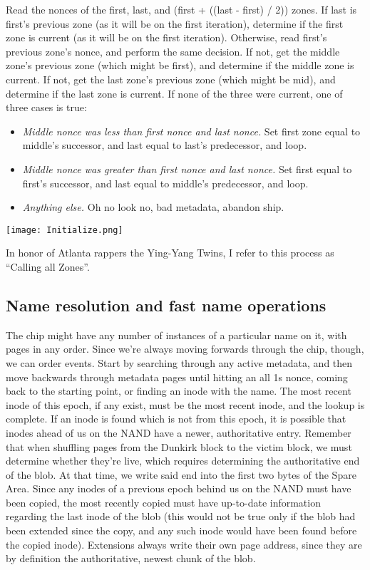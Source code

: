 \documentclass[letterpaper,10pt]{article}
\newenvironment{denseitemize}{
  \begin{itemize}
      \setlength{\itemsep}{0pt}
}{
  \end{itemize}
}
\begin{document}
Read the nonces of the first, last, and (first + ((last - first) / 2)) zones.
If last is first's previous zone (as it will be on the first iteration),
determine if the first zone is current (as it will be on the first iteration).
Otherwise, read first's previous zone's nonce, and perform the same
decision. If not, get the middle zone's previous zone (which might be first),
and determine if the middle zone is current. If not, get the last zone's previous
zone (which might be mid), and determine if the last zone is current. If none
of the three were current, one of three cases is true:
\begin{denseitemize}
\item \textit{Middle nonce was less than first nonce and last nonce.} Set first zone
  equal to middle's successor, and last equal to last's predecessor, and loop.
\item \textit{Middle nonce was greater than first nonce and last nonce.} Set
  first equal to first's successor, and last equal to middle's predecessor, and
  loop.
\item \textit{Anything else.} Oh no look no, bad metadata, abandon ship.
\end{denseitemize}

\begin{center}
\texttt{[image: Initialize.png]}
\end{center}
In honor of Atlanta rappers the Ying-Yang Twins, I refer to this process as
``Calling all Zones''.

\subsection{Name resolution and fast name operations}
The chip might have any number of instances of a particular name on it, with
pages in any order. Since we're always moving forwards through the chip, though,
we can order events. Start by searching through any active metadata, and then move
backwards through metadata pages until hitting an all 1s nonce, coming back to
the starting point, or finding an inode with the name. The most recent inode
of this epoch, if any exist, must be the most recent inode, and the lookup is
complete. If an inode is found which is not from this epoch, it is possible that
inodes ahead of us on the NAND have a newer, authoritative entry. Remember that
when shuffling pages from the Dunkirk block to the victim block, we must determine
whether they're live, which requires determining the authoritative end of the
blob. At that time, we write said end into the first two bytes of the Spare Area.
Since any inodes of a previous epoch behind us on the NAND must have been copied,
the most recently copied must have up-to-date information regarding the last
inode of the blob (this would not be true only if the blob had been extended
since the copy, and any such inode would have been found before the copied
inode). Extensions always write their own page address, since they are by
definition the authoritative, newest chunk of the blob.
\end{document}
